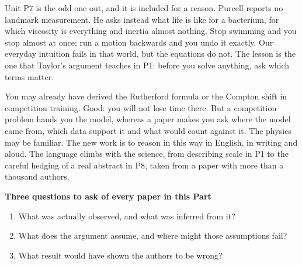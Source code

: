\documentclass[11pt,a4paper]{article}
\begin{document}
\pn Unit P7 is the odd one out, and it is included for a reason. Purcell reports no landmark measurement. He asks instead what life is like for a bacterium, for which viscosity is everything and inertia almost nothing. Stop swimming and you stop almost at once; run a motion backwards and you undo it exactly. Our everyday intuition fails in that world, but the equations do not. The lesson is the one that Taylor's argument teaches in P1: before you solve anything, ask which terms matter.

\pn You may already have derived the Rutherford formula or the Compton shift in competition training. Good: you will not lose time there. But a competition problem hands you the model, whereas a paper makes you ask where the model came from, which data support it and what would count against it. The physics may be familiar. The new work is to reason in this way in English, in writing and aloud. The language climbs with the science, from describing scale in P1 to the careful hedging of a real abstract in P8, taken from a paper with more than a thousand authors.

\clearpage
\normallayout

\begin{tipbox}
\textbf{Three questions to ask of every paper in this Part}
\begin{enumerate}[label=\arabic*.]
  \item What was actually observed, and what was inferred from it?
  \item What does the argument assume, and where might those assumptions fail?
  \item What result would have shown the authors to be wrong?
\end{enumerate}
\end{tipbox}

\end{document}
